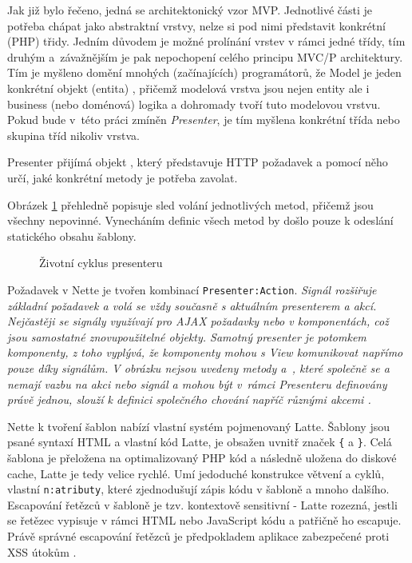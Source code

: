 Jak již bylo řečeno, jedná se architektonický vzor MVP. 
Jednotlivé části je potřeba chápat jako abstraktní vrstvy, nelze si pod nimi představit konkrétní (PHP) třidy. Jedním důvodem je možné prolínání vrstev v rámci jedné třídy, tím druhým a~závažnějším je pak nepochopení celého principu MVC/P architektury. Tím je myšleno domění mnohých (začínajících) programátorů, že Model je jeden konkrétní objekt (entita) \cite{MVCmodel}, přičemž modelová vrstva jsou nejen entity ale i business (nebo doménová) logika a dohromady tvoří tuto modelovou vrstvu. Pokud bude v~této práci zmíněn \textit{Presenter}, je tím myšlena konkrétní třída nebo skupina tříd nikoliv vrstva.


Presenter přijímá objekt , který představuje HTTP požadavek a pomocí něho určí, jaké konkrétní metody je potřeba zavolat. 

Obrázek \ref{fig:zivotniCyklusPresenteru} přehledně popisuje sled volání jednotlivých metod, přičemž jsou všechny nepovinné. Vynecháním definic všech metod by došlo pouze k odeslání statického obsahu šablony.

\begin{figure}[h]
		\centering \footnotesize {}\selectfont
		
		\normalsize \sffamily
		\captionsetup{width=\linewidth}
		\caption[Životní cyklus presenteru]{Životní cyklus presenteru \cite{NetteDocs}}
		\label{fig:zivotniCyklusPresenteru}
\end{figure}

Požadavek v Nette je tvořen kombinací \texttt{Presenter:Action}. \it{Signál} rozšiřuje základní požadavek a volá se vždy současně s aktuálním presenterem a akcí. Nejčastěji se signály využívají pro AJAX požadavky nebo v komponentách, což jsou samostatné znovupoužitelné objekty. Samotný presenter je potomkem komponenty, z toho vyplývá, že komponenty mohou s View komunikovat napřímo pouze díky signálům. V obrázku nejsou uvedeny metody  a~, které společně se  a  nemají vazbu na \it{akci} nebo \it{signál} a mohou být v~rámci Presenteru definovány právě jednou, slouží k definici společného chování napříč různými akcemi \cite{NettePresentery}.

Nette k tvoření šablon nabízí vlastní systém pojmenovaný Latte. Šablony jsou psané syntaxí HTML a vlastní kód Latte, je obsažen uvnitř značek \texttt{\{} a \texttt{\}}. Celá šablona je přeložena na optimalizovaný PHP kód a následně uložena do diskové cache, Latte je tedy velice rychlé. Umí jedoduché konstrukce větvení a cyklů, vlastní \texttt{n:atributy}, které zjednodušují zápis kódu v šabloně a mnoho dalšího. Escapování řetězců v šabloně je tzv. kontextově sensitivní - Latte rozezná, jestli se řetězec vypisuje v rámci HTML nebo JavaScript kódu a patřičně ho escapuje. Právě správné escapování řetězců je předpokladem aplikace zabezpečené proti XSS útokům \cite{XssPrevention}\cite{Latte}.

